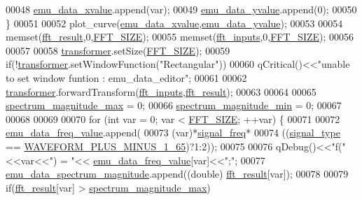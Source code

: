 \begin{DoxyCode}
00048         \hyperlink{a00004_a66d07ec51f26cd9b84994548faa336d6}{emu\_data\_xvalue}.append(var);
00049         \hyperlink{a00004_ad922d05d1e988d84f404c115fe909f72}{emu\_data\_yvalue}.append(0);
00050     \}
00051 
00052     plot\_curve(\hyperlink{a00004_a66d07ec51f26cd9b84994548faa336d6}{emu\_data\_xvalue},\hyperlink{a00004_ad922d05d1e988d84f404c115fe909f72}{emu\_data\_yvalue});
00053 
00054     memset(\hyperlink{a00004_a63b6150bfbba86ba943877a2f547ddd8}{fft\_result},0,\hyperlink{a00036_a636ddc19af00bc87969a07c88331f105}{FFT\_SIZE});
00055     memset(\hyperlink{a00004_a8782fc20094d65d56c04869b9692902e}{fft\_inputs},0,\hyperlink{a00036_a636ddc19af00bc87969a07c88331f105}{FFT\_SIZE});
00056 
00057 
00058     \hyperlink{a00004_a0d6e12337ef942452edea37827e58cd4}{transformer}.setSize(\hyperlink{a00036_a636ddc19af00bc87969a07c88331f105}{FFT\_SIZE});
00059     \textcolor{keywordflow}{if}(!\hyperlink{a00004_a0d6e12337ef942452edea37827e58cd4}{transformer}.setWindowFunction(\textcolor{stringliteral}{"Rectangular"}))
00060         qCritical()<<\textcolor{stringliteral}{"unable to set window funtion : emu\_data\_editor"};
00061 
00062     \hyperlink{a00004_a0d6e12337ef942452edea37827e58cd4}{transformer}.forwardTransform(\hyperlink{a00004_a8782fc20094d65d56c04869b9692902e}{fft\_inputs},\hyperlink{a00004_a63b6150bfbba86ba943877a2f547ddd8}{fft\_result});
00063 
00064 
00065     \hyperlink{a00004_ae0119c7dd2179cdcb3ea37adbefdc289}{spectrum\_magnitude\_max} = 0;
00066     \hyperlink{a00004_afb692cc49c350d4bf120ca1e3dd61e93}{spectrum\_magnitude\_min} = 0;
00067 
00068 
00069 
00070     \textcolor{keywordflow}{for} (\textcolor{keywordtype}{int} var = 0; var < \hyperlink{a00036_a636ddc19af00bc87969a07c88331f105}{FFT\_SIZE}; ++var) \{
00071 
00072         \hyperlink{a00004_a62129d59e218ab857cd50cb202205129}{emu\_data\_freq\_value}.append(
00073                     (var)*\hyperlink{a00004_a67039999d520fc483fab521fae5ddde4}{signal\_freq}*
00074                     ((\hyperlink{a00004_a070edaec5aee6ba1f5a6866bc32c8ce4}{signal\_type} == \hyperlink{a00034_a0923d3b365a36e1e8c401cec964aa36f}{WAVEFORM\_PLUS\_MINUS\_1\_65})?1:2));
00075 
00076         qDebug()<<\textcolor{stringliteral}{"f("}<<var<<\textcolor{stringliteral}{") = "}<< \hyperlink{a00004_a62129d59e218ab857cd50cb202205129}{emu\_data\_freq\_value}[var]<<\textcolor{stringliteral}{";"};
00077         \hyperlink{a00004_ac3c515466f79ab8e60a58e8d15a3b991}{emu\_data\_spectrum\_magnitude}.append((\textcolor{keywordtype}{double})
      \hyperlink{a00004_a63b6150bfbba86ba943877a2f547ddd8}{fft\_result}[var]);
00078 
00079         \textcolor{keywordflow}{if}(\hyperlink{a00004_a63b6150bfbba86ba943877a2f547ddd8}{fft\_result}[var] > \hyperlink{a00004_ae0119c7dd2179cdcb3ea37adbefdc289}{spectrum\_magnitude\_max})

\end{DoxyCode}
